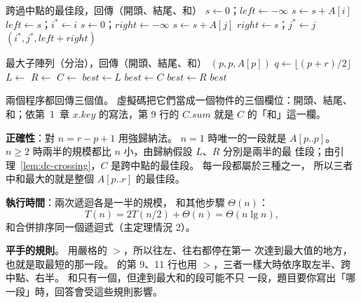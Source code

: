 \begin{pseudo}[label=alg:dc-crossing]{跨過中點的最佳段，回傳（開頭、結尾、和）}
    \State $s \gets 0$；$\mathit{left} \gets -\infty$
        \State $s \gets s + A[i]$
            \State $\mathit{left} \gets s$；$i^* \gets i$
        \EndIf
    \EndFor
    \State $s \gets 0$；$\mathit{right} \gets -\infty$
        \State $s \gets s + A[j]$
            \State $\mathit{right} \gets s$；$j^* \gets j$
        \EndIf
    \EndFor
    \State \Return $(i^*, j^*, \mathit{left} + \mathit{right})$
\EndFunction
\end{pseudo}

\begin{pseudo}[label=alg:dc-maxsub]{最大子陣列（分治），回傳（開頭、結尾、和）}
        \State \Return $(p, p, A[p])$
    \EndIf
    \State $q \gets \lfloor (p + r)/2 \rfloor$
    \State $L \gets$ 
    \State $R \gets$ 
    \State $C \gets$ 
    \State $\mathit{best} \gets L$
        \State $\mathit{best} \gets C$
    \EndIf
        \State $\mathit{best} \gets R$
    \EndIf
    \State \Return $\mathit{best}$
\EndFunction
\end{pseudo}

兩個程序都回傳三個值。 虛擬碼把它們當成一個物件的三個欄位：開頭、結尾、和；依第~1~章
$x.\mathit{key}$ 的寫法，第 9 行的 $C.\mathit{sum}$ 就是 $C$ 的「和」這一欄。

\textbf{正確性}：對 $n = r - p + 1$ 用強歸納法。 $n = 1$ 時唯一的一段就是
$A[p..p]$。 $n \ge 2$ 時兩半的規模都比 $n$ 小，由歸納假設 $L$、$R$ 分別是兩半的最
佳段；由引理~\ref{lem:dc-crossing}，$C$ 是跨中點的最佳段。 每一段都屬於三種之一，
所以三者中和最大的就是整個 $A[p..r]$ 的最佳段。

\textbf{執行時間}：兩次遞迴各是一半的規模， 和其他步驟
$\Theta(n)$：
\[
T(n) = 2T(n/2) + \Theta(n) = \Theta(n \lg n),
\]
和合併排序同一個遞迴式（主定理情況 2）。

\textbf{平手的規則}。  用嚴格的 $>$，所以往左、往右都停在第一
次達到最大值的地方，也就是取最短的那一段。  的第 9、11 行也用
$>$，三者一樣大時依序取左半、跨中點、右半。 和只有一個，但達到最大和的段可能不只
一段，題目要你寫出「哪一段」時，回答會受這些規則影響。

